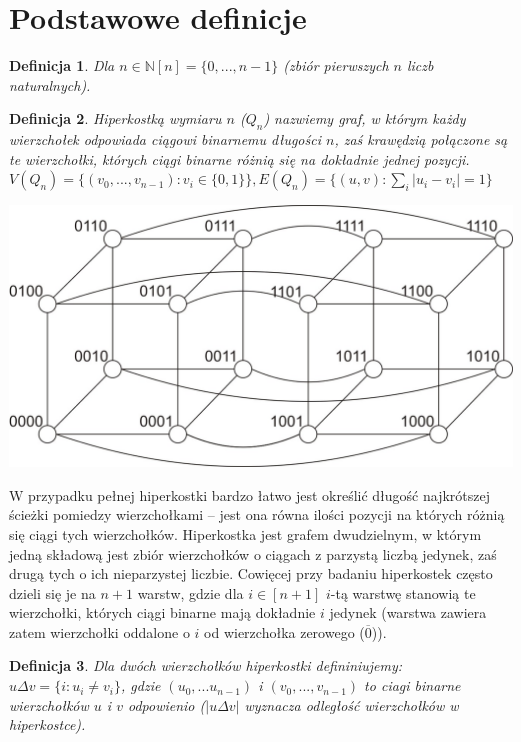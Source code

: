 \documentclass{pracamgr}
\newtheorem{defi}{Definicja}[section] %
\begin{document}
  \section{Podstawowe definicje}
   \begin{defi}\label{[n]}
    Dla $n\in\mathbb{N}$\quad $[n]=\{0,...,n-1\}$ (zbiór pierwszych $n$ liczb naturalnych).
   \end{defi}
   \begin{defi}\label{hiperkostka}
    \emph{Hiperkostką wymiaru $n$ ($Q_n$)} nazwiemy graf, w którym każdy wierzchołek odpowiada ciągowi binarnemu długości $n$,
    zaś krawędzią połączone są te wierzchołki, których ciągi binarne różnią się na dokładnie jednej pozycji.\newline
    $V(Q_n)=\{(v_0,...,v_{n-1}):v_i\in\{0,1\}\}, E(Q_n)=\{(u,v):\sum_{i}|u_i-v_i|=1\}$
   \end{defi}
   \begin{center}
    \includegraphics[scale=0.6]{img/Q_4.jpg}
   \end{center}
   W przypadku pełnej hiperkostki
   bardzo łatwo jest określić długość najkrótszej ścieżki pomiedzy wierzchołkami --
   jest ona równa ilości pozycji na których różnią się ciągi tych wierzchołków.\newline
   Hiperkostka jest grafem dwudzielnym, w którym jedną składową jest zbiór wierzchołków o ciągach z parzystą liczbą jedynek,
   zaś drugą tych o ich nieparzystej liczbie.\newline
   Cowięcej przy badaniu hiperkostek często dzieli się je na $n+1$ warstw, gdzie dla $i\in[n+1]$ $i$-tą warstwę stanowią te wierzchołki,
   których ciągi binarne mają dokładnie $i$ jedynek (warstwa zawiera zatem wierzchołki oddalone o $i$ od wierzchołka zerowego ($\overline{0}$)).
   \begin{defi}\label{delta wierzcholkow}
    Dla dwóch wierzchołków hiperkostki defininiujemy:
    $u\Delta v=\{i:u_i\neq v_i\}$, gdzie $(u_0,...u_{n-1})$ i $(v_0,...,v_{n-1})$ to ciagi binarne wierzchołków $u$ i $v$ odpowienio
    ($|u\Delta v|$ wyznacza odległość wierzchołków w hiperkostce).
   \end{defi}
\end{document}
